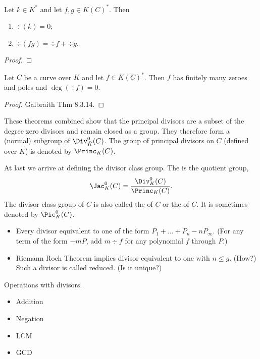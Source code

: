 \begin{proposition}
  Let $k \in K^*$ and let $f, g \in K(C)^*$. Then
  \begin{enumerate}[label=(\roman*)]
    \item $\div(k) = 0$;
    \item $\div(fg) = \div f + \div g$.
  \end{enumerate}
\end{proposition}
\begin{proof}
\end{proof}
\begin{theorem}
  Let $C$ be a curve over $K$ and let $f \in K(C)^*$.
  Then $f$ has finitely many zeroes and poles and $\deg(\div f) = 0$.
\end{theorem}
\begin{proof}
  Galbraith Thm 8.3.14.
\end{proof}

These theorems combined show that the principal divisors are a subset of the degree zero divisors and remain closed as a group.
They therefore form a (normal) subgroup of $\Div_{\bar K}^0(C)$.
The group of principal divisors on $C$ (defined over $K$) is denoted by $\Princ_K(C)$.

At last we arrive at defining the divisor class group.
The  is the quotient group,
  \[ \Jac_K^0(C) = \frac{\Div_K^0(C)}{\Princ_K(C)}. \]
The divisor class group of $C$ is also called the  of $C$ or the  of $C$.
It is sometimes denoted by $\Pic_K^0(C)$.

\begin{itemize}
  \item Every divisor equivalent to one of the form $P_1 + \dots + P_n - nP_\infty$.
        (For any term of the form $-mP$, add $m \div f$ for any polynomial $f$ through $P$.)
  \item Riemann Roch Theorem implies divisor equivalent to one with $n \leq g$. (How?)
        Such a divisor is called reduced. (Is it unique?)
\end{itemize}

Operations with divisors.
\begin{itemize}
  \item Addition
  \item Negation
  \item LCM
  \item GCD
\end{itemize}



